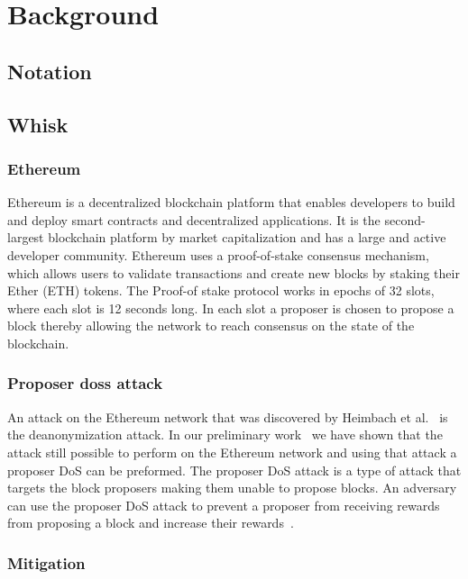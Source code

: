 
\section{Background}\label{sec:background}


\subsection{Notation}\label{sec:background-notation}


\subsection{Whisk}\label{sec:related-work-whisk}

\subsubsection{Ethereum}\label{sec:background-ethereum}
Ethereum is a decentralized blockchain platform that enables developers to build and deploy smart contracts and decentralized applications.
It is the second-largest blockchain platform by market capitalization and has a large and active developer community.
Ethereum uses a proof-of-stake consensus mechanism, which allows users to validate transactions and create new blocks by staking their Ether (ETH) tokens.
The Proof-of stake protocol works in epochs of 32 slots, where each slot is 12 seconds long.
In each slot a proposer is chosen to propose a block thereby allowing the network to reach consensus on the state of the blockchain.

\subsubsection{Proposer doss attack}\label{sec:background-proposer-doss-attacks}
An attack on the Ethereum network that was discovered by Heimbach et al.~\cite{heimbach2024deanonymizingethereumvalidatorsp2p} is the deanonymization attack.
In our preliminary work~\cite{ouroldpaper} we have shown that the attack still possible to perform on the Ethereum network and using that attack a proposer DoS can be preformed.
The proposer DoS attack is a type of attack that targets the block proposers making them unable to propose blocks.
An adversary can use the proposer DoS attack to prevent a proposer from receiving rewards from proposing a block and increase their rewards~\cite{EthereumSSLE2024}.

\subsubsection{Mitigation}\label{sec:background-mitigation}


